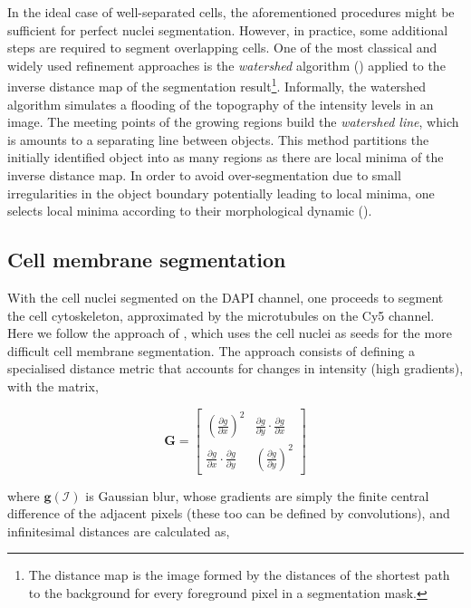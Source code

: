 In the ideal case of well-separated cells, the aforementioned procedures might be sufficient for perfect nuclei segmentation. However, in practice, some additional steps are required to segment overlapping cells. One of the most classical and widely used refinement approaches is the \emph{watershed} algorithm (\cite{beucher1979use}) applied to the inverse distance map of the segmentation result\footnote{The distance map is the image formed by the distances of the shortest path to the background for every foreground pixel in a segmentation mask.}. Informally, the watershed algorithm simulates a flooding of the topography of the intensity levels in an image. The meeting points of the growing regions build the \emph{watershed line}, which is amounts to a separating line between objects. This method partitions the initially identified object into as many regions as there are local minima of the inverse distance map. In order to avoid over-segmentation due to small irregularities in the object boundary potentially leading to local minima, one selects local minima according to their morphological dynamic (\cite{Grimaud1992}).

\subsection{Cell membrane segmentation}

With the cell nuclei segmented on the DAPI channel, one proceeds to segment the cell cytoskeleton, approximated by the microtubules on the Cy5 channel. Here we follow the approach of \cite{jones2005voronoi}, which uses the cell nuclei as seeds for the more difficult cell membrane segmentation. The approach consists of defining a specialised distance metric that accounts for changes in intensity (high gradients), with the matrix,

\begin{equation}
\mathbf{G} = \begin{bmatrix}
(\frac{\partial g}{\partial x})^2 & \frac{\partial g}{\partial y}\cdot\frac{\partial g}{\partial x}\\
\frac{\partial g}{\partial x}\cdot\frac{\partial g}{\partial y} & (\frac{\partial g}{\partial y})^2
\end{bmatrix}
\end{equation}

where $\mathbf{g}(\mathcal{I})$ is Gaussian blur, whose gradients are simply the finite central difference of the adjacent pixels (these too can be defined by convolutions), and infinitesimal distances are calculated as,

